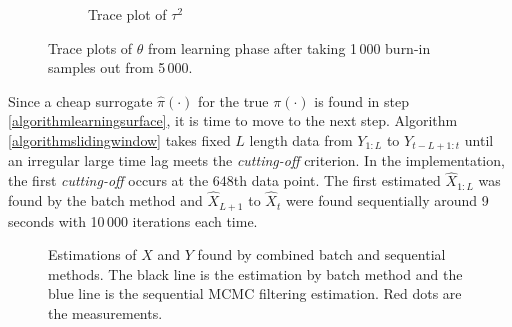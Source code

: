 \begin{figure}[h]
\begin{subfigure}[t]{0.45\textwidth}
	\caption{Trace plot of $\tau^2$}
\end{subfigure}
\caption{Trace plots of $\theta$ from learning phase after taking 1\,000 burn-in samples out from 5\,000. }
\end{figure}


Since a cheap surrogate $\hat{\pi}(\cdot)$ for the true $\pi(\cdot)$ is found in step \ref{algorithmlearningsurface}, it is time to move to the next step. Algorithm \ref{algorithmslidingwindow} takes fixed $L$ length data from $Y_{1:L}$ to $Y_{t-L+1:t}$ until an irregular large time lag meets the \textit{cutting-off} criterion. In the implementation, the first \textit{cutting-off} occurs at the $648$th data point. The first estimated $\hat{X}_{1:L}$ was found by the batch method and $\hat{X}_{L+1}$ to $\hat{X}_{t}$ were found sequentially around 9 seconds with 10\,000 iterations each time. 

\begin{figure}[h]
\centering
\caption{Estimations of $X$ and $Y$ found by combined batch and sequential methods. The black line is the estimation by batch method and the blue line is the sequential MCMC filtering estimation. Red dots are the measurements.}
\end{figure}



